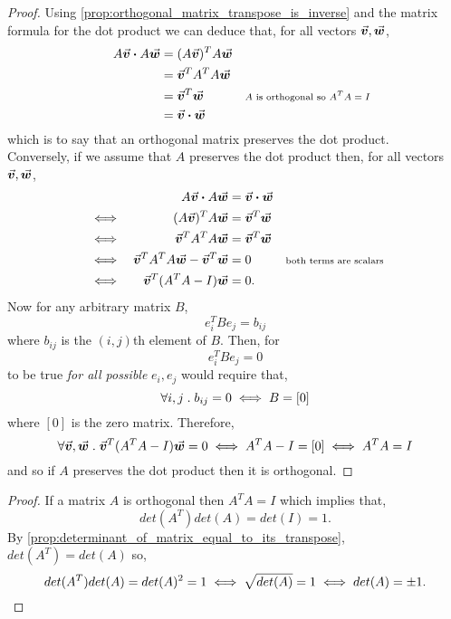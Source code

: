 \documentclass[MathsNotesBase.tex]{subfiles}
\begin{document}
{		\bigskip
		\begin{proof}
			Using \autoref{prop:orthogonal_matrix_transpose_is_inverse} and the matrix formula for the dot product we can deduce that, for all vectors ${ \vec{\bm{v}},\vec{\bm{w}} }$,
			\begin{align*}
			&& A\vec{\bm{v}} \boldsymbol{\cdot} A\vec{\bm{w}} &= (A\vec{\bm{v}})^T A\vec{\bm{w}} \\
			&&  &= \vec{\bm{v}}^TA^TA\vec{\bm{w}} &\text{\scriptsize{}} \\
			&&  &= \vec{\bm{v}}^T\vec{\bm{w}} &\text{\scriptsize{$A$ is orthogonal so ${A^TA = I}$}} \\
			&&  &= \vec{\bm{v}} \boldsymbol{\cdot} \vec{\bm{w}}
			\end{align*}
			which is to say that an orthogonal matrix preserves the dot product.\\
			
			Conversely, if we assume that $A$ preserves the dot product then, for all vectors ${ \vec{\bm{v}},\vec{\bm{w}} }$,
			\begin{align*}
			&& A\vec{\bm{v}} \boldsymbol{\cdot} A\vec{\bm{w}} &= \vec{\bm{v}} \boldsymbol{\cdot} \vec{\bm{w}}  \\
			&\iff & (A\vec{\bm{v}})^TA\vec{\bm{w}} &= \vec{\bm{v}}^T\vec{\bm{w}} & \\
			&\iff & \vec{\bm{v}}^TA^TA\vec{\bm{w}} &= \vec{\bm{v}}^T\vec{\bm{w}} & \\
			&\iff & \vec{\bm{v}}^TA^TA\vec{\bm{w}} - \vec{\bm{v}}^T\vec{\bm{w}} &= 0 & \text{\scriptsize{both terms are scalars}}\\
			&\iff & \vec{\bm{v}}^T(A^TA - I)\vec{\bm{w}} &= 0. &
			\end{align*}
			Now for any arbitrary matrix $B$, 
			\[ e_i^TBe_j = b_{ij} \]
			where $b_{ij}$ is the $(i,j)$th element of $B$. Then, for
			\[ e_i^TBe_j = 0 \]
			to be true \textit{for all possible} ${ e_i,e_j }$ would require that, 
			\[ \forall i,j \;.\; b_{ij} = 0 \iff B = [0] \]
			where $[0]$ is the zero matrix. Therefore,
			\[ \forall \vec{\bm{v}},\vec{\bm{w}} \;.\; \vec{\bm{v}}^T(A^TA - I)\vec{\bm{w}} = 0 \iff A^TA - I = [0] \iff A^TA = I \]
			and so if $A$ preserves the dot product then it is orthogonal.
		\end{proof}
	
	
		\bigskip
		\begin{proof}
			If a matrix $A$ is orthogonal then ${ A^TA = I }$ which implies that,
			\[ det(A^T)det(A) = det(I) = 1. \]
			By \autoref{prop:determinant_of_matrix_equal_to_its_transpose}, ${ det(A^T) = det(A) }$ so,
			\[ det(A^T)det(A) = det(A)^2 = 1 \iff \sqrt{det(A)} = 1 \iff det(A) = \pm 1.  \qedhere \]
		\end{proof}
	
}
\end{document}

